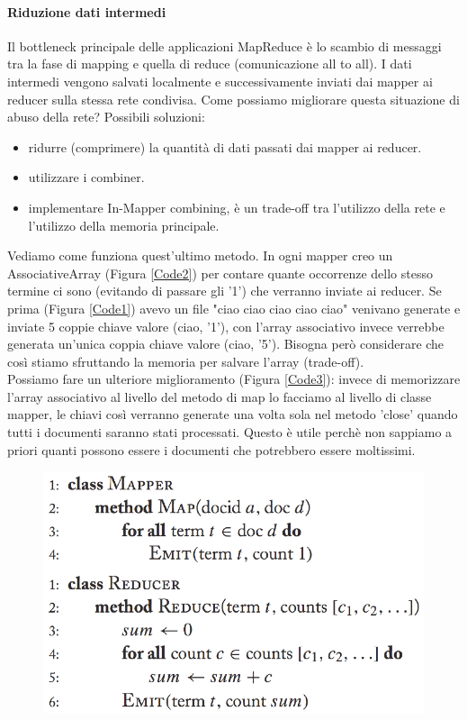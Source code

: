 \documentclass{article}
\begin{document}
\begin{appendices}
\paragraph{Riduzione dati intermedi}
Il bottleneck principale delle applicazioni MapReduce è lo scambio di messaggi tra la fase di mapping e quella di reduce (comunicazione all to all). I dati intermedi vengono salvati localmente e successivamente inviati dai mapper ai reducer sulla stessa rete condivisa. Come possiamo migliorare questa situazione di abuso della rete? Possibili soluzioni:
\begin{itemize}
    \item ridurre (comprimere) la quantità di dati passati dai mapper ai reducer.
    \item utilizzare i combiner.  
    \item implementare In-Mapper combining, è un trade-off tra l'utilizzo della rete e l'utilizzo della memoria principale.
\end{itemize}
Vediamo come funziona quest'ultimo metodo.
In ogni mapper creo un AssociativeArray (Figura \ref{Code2}) per contare quante occorrenze dello stesso termine ci sono (evitando di passare gli '1') che verranno inviate ai reducer. Se prima (Figura \ref{Code1}) avevo un file "ciao ciao ciao ciao ciao" venivano generate e inviate 5 coppie chiave valore (ciao, '1'), con l'array associativo invece verrebbe generata un'unica coppia chiave valore (ciao, '5'). Bisogna però considerare che così stiamo sfruttando la memoria per salvare l'array (trade-off). \\
Possiamo fare un ulteriore miglioramento (Figura \ref{Code3}): invece di memorizzare l'array associativo al livello del metodo di map lo facciamo al livello di classe mapper, le chiavi così verranno generate una volta sola nel metodo 'close' quando tutti i documenti saranno stati processati. Questo è utile perchè non sappiamo a priori quanti possono essere i documenti che potrebbero essere moltissimi. 
\begin{figure}[H]
    \centering
    \includegraphics[scale=0.5]{img/In_mapper1.PNG}

\end{figure}
\end{appendices}
\end{document}
